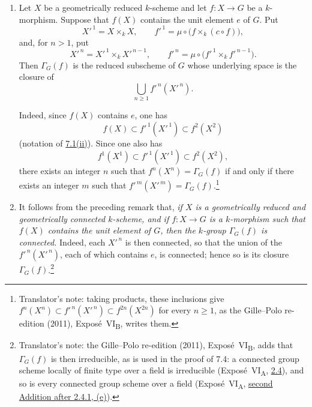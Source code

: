 \begin{enumerate}
\item[\textup{(v)}]\label{rem:sga3-VIB-7.2-v}
  Let \(X\) be a geometrically reduced \(k\)-scheme and let
  \(f:X\to G\) be a \(k\)-morphism. Suppose that \(f(X)\)
  contains the unit element \(e\) of \(G\). Put
  \[
    X'^{\,1}=X\times_kX,
    \qquad
    f'^{\,1}=\mu\circ\bigl(f\times_k(c\circ f)\bigr),
  \]
  and, for \(n>1\), put
  \label{form:sga3-VIB-7.2-v-recursion}%
  \[
    X'^{\,n}=X'^{\,1}\times_kX'^{\,n-1},
    \qquad
    f'^{\,n}
      =\mu\circ\bigl(f'^{\,1}\times_k f'^{\,n-1}\bigr).
  \]
  Then \(\Gamma_G(f)\) is the reduced subscheme of \(G\) whose
  underlying space is the closure of
  \[
    \bigcup_{n\geq1}f'^{\,n}(X'^{\,n}).
  \]

  Indeed, since \(f(X)\) contains \(e\), one has
  \label{form:sga3-VIB-7.2-v-inclusions}%
  \[
    f(X)\subset f'^{\,1}(X'^{\,1})\subset f^2(X^2)
  \]
  (notation of \hyperref[concl:sga3-VIB-7.1-ii]{7.1\textup{(ii)}}).
  Since one also has
  \[
    f^1(X^1)\subset f'^{\,1}(X'^{\,1})\subset f^2(X^2),
  \]
  there exists an integer \(n\) such that
  \(f^n(X^n)=\Gamma_G(f)\) if and only if there exists an
  integer \(m\) such that
  \(f'^{\,m}(X'^{\,m})=\Gamma_G(f)\).\footnote{Translator's note: taking products, these inclusions give
  \(f^n(X^n)\subset f'^{\,n}(X'^{\,n})\subset f^{2n}(X^{2n})\) for every \(n\geq1\), as the Gille--Polo
  re-edition (2011), Exposé~VI\textsubscript{B}, writes them.}

\item[\textup{(vi)}]\label{rem:sga3-VIB-7.2-vi}
  It follows from the preceding remark that, \emph{if \(X\) is a
  geometrically reduced and geometrically connected \(k\)-scheme,
  and if \(f:X\to G\) is a \(k\)-morphism such that \(f(X)\)
  contains the unit element of \(G\), then the \(k\)-group
  \(\Gamma_G(f)\) is connected.} Indeed, each \(X'^{\,n}\) is then
  connected, so that the union of the \(f'^{\,n}(X'^{\,n})\), each
  of which contains \(e\), is connected; hence so is its closure
  \(\Gamma_G(f)\).\footnote{Translator's note: the Gille--Polo re-edition (2011), Exposé~VI\textsubscript{B}, adds
  that \(\Gamma_G(f)\) is then irreducible, as is used in the proof of 7.4: a connected group scheme locally of
  finite type over a field is irreducible (Exposé~VI\textsubscript{A}, \hyperref[prop:sga3-VIA-2.4]{2.4}), and
  so is every connected group scheme over a field (Exposé~VI\textsubscript{A},
  \hyperref[thm:sga3-VIA-2.6.5]{second Addition after 2.4.1, (e)}).}
\end{enumerate}
